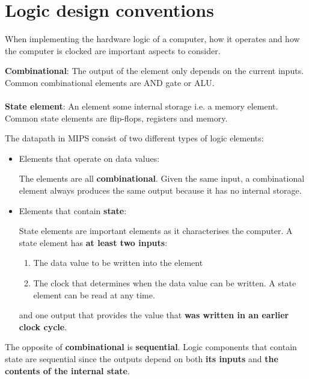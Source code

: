 \documentclass[10pt,a4paper]{article}
\begin{document}
\section{Logic design conventions}

When implementing the hardware logic of a computer, how it operates and how the computer is clocked
are important aspects to consider.

\begin{tcolorbox}[breakable,colback=white]
\textbf{Combinational}: The output of the element only depends on the current inputs. Common
combinational elements are AND gate or ALU.
\\
\\
\textbf{State element}:  An element some internal storage i.e. a memory element. Common state
elements are flip-flops, registers and memory.
\end{tcolorbox}

The datapath in MIPS consist of two different types of logic elements: 
\begin{itemize}
    \item Elements that operate on data values:
    
    The elements are all \textbf{combinational}. Given the same input, a combinational element
    always produces the same output because it has no internal storage.

    \item Elements that contain \textbf{state}:
    
    State elements are important elements as it characterises the computer. A state element has
    \textbf{at least two inputs}:  
    \begin{enumerate}
        \item The data value to be written into the element
        \item The clock that determines when the data value can be written. A state element can be read at any time.
    \end{enumerate}
    and one output that provides the value that \textbf{was written in an earlier clock cycle}.
\end{itemize}

The opposite of \textbf{combinational} is \textbf{sequential}. Logic components that contain state
are sequential since the outputs depend on both \textbf{its inputs} and \textbf{the contents of the
internal state}.
\end{document}
